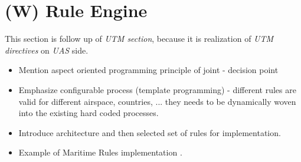\section{(W) Rule Engine}\label{sec:ruleEngine}
    \noindent This section is follow up of \emph{UTM section}, because it is realization of \emph{UTM directives} on \emph{UAS} side.
    \begin{itemize}
        \item Mention aspect oriented programming principle of joint - decision point
        \item Emphasize configurable process (template programming) - different rules are valid for different airspace, countries, ... they needs to be dynamically woven into the existing hard coded processes. 
        \item Introduce architecture and then selected set of rules for implementation.
		\item Example of Maritime Rules implementation \cite{benjamin2006navigation}.
    \end{itemize}